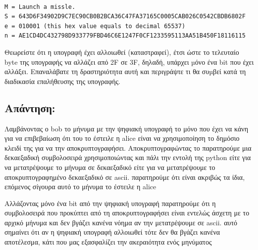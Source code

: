 \begin{lstlisting}

M = Launch a missle.
S = 643D6F34902D9C7EC90CB0B2BCA36C47FA37165C0005CAB026C0542CBDB6802F
e = 010001 (this hex value equals to decimal 65537)
n = AE1CD4DC432798D933779FBD46C6E1247F0CF1233595113AA51B450F18116115
\end{lstlisting}

\noindent
Θεωρείστε ότι η υπογραφή έχει αλλοιωθεί (καταστραφεί), έτσι ώστε το τελευταίο byte της
υπογραφής να αλλάζει από 2F σε 3F, δηλαδή, υπάρχει µόνο ένα bit που έχει αλλάξει.
Επαναλάβατε τη δραστηριότητα αυτή και περιγράψτε τι θα συµβεί κατά τη διαδικασία
επαλήθευσης της υπογραφής.

\subsection*{Απάντηση:}
\noindent
Λαμβάνοντας ο bob το μήνυμα με την ψηφιακή υπογραφή το μόνο που έχει να κάνη για να επιβεβαίωση ότι
του το έστειλε η alice είναι να χρησιμοποίηση το δημόσιο κλειδί της για να την αποκρυπτογραφήσει.
Αποκρυπτογραφώντας το παρατηρούμε μια δεκαεξαδική συμβολοσειρά χρησιμοποιώντας και πάλι την εντολή
της python είτε για να μετατρέψουμε το μήνυμα σε δεκαεξαδικό είτε για να μετατρέψουμε το αποκρυπτογραφημένο
δεκαεξαδικό σε ascii. παρατηρούμε ότι είναι ακριβώς τα ίδια, επόμενος σίγουρα αυτό το μήνυμα το έστειλε
η alice

\noindent
Αλλάζοντας μόνο ένα bit από την ψηφιακή υπογραφή παρατηρούμε ότι η συμβολοσειρά που προκύπτει
από τη αποκρυπτογραφήσει είναι εντελώς άσχετη με το αρχικό μήνυμα και δεν βγάζει κανένα νόημα 
αν την μετατρέψουμε σε ascii. αυτό σημαίνει ότι αν η ψηφιακή υπογραφή αλλοιωθεί τότε δεν θα βγάζει
κανένα αποτέλεσμα, κάτι που μας εξασφαλίζει την ακεραιότητα ενός μηνύματος 

